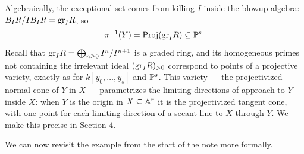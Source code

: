 \documentclass[12pt]{amsproc}
\begin{document}
    Algebraically, the exceptional set comes from killing $I$ inside the blowup algebra: $B_I R / I B_I R = \gr_I R$, so
    \[\pi^{-1}(Y) = \Proj(\gr_I R) \subseteq \P^s.\]
    Recall that $\gr_I R = \bigoplus_{n \geq 0} I^n/I^{n+1}$ is a graded ring, and its homogeneous primes not containing the irrelevant ideal $(\gr_I R)_{>0}$ correspond to points of a projective variety, exactly as for $k[y_0,\ldots,y_s]$ and $\P^s$. This variety --- the projectivized normal cone of $Y$ in $X$ --- parametrizes the limiting directions of approach to $Y$ inside $X$: when $Y$ is the origin in $X \subseteq \A^r$ it is the projectivized tangent cone, with one point for each limiting direction of a secant line to $X$ through $Y$. We make this precise in Section 4.

    We can now revisit the example from the start of the note more formally.









\end{document}
